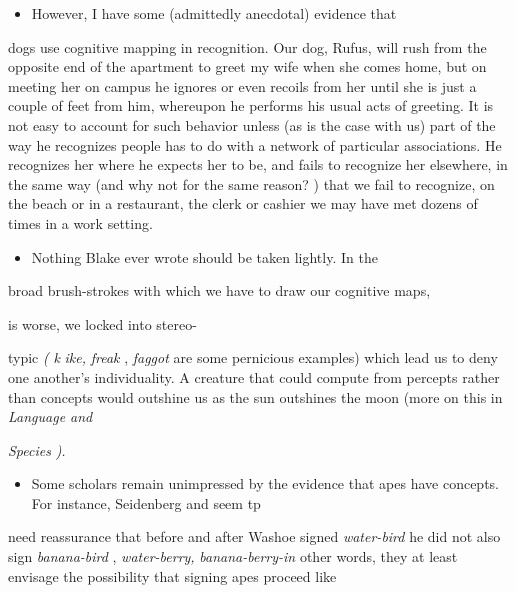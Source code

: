 \begin{itemize}
\begin{itemize}
\begin{itemize}
\begin{itemize}
\begin{itemize}
\begin{itemize}
\begin{itemize}
\begin{itemize}
\begin{itemize}
\begin{itemize}
\begin{itemize}
\begin{itemize}
\begin{itemize}
\item However, I have some (admittedly anecdotal) evidence that
\end{itemize}

dogs use cognitive mapping in recognition. Our dog, Rufus, will rush from the opposite end of the apartment to greet my wife when she comes home, but on meeting her on campus he ignores or even recoils from her until she is just a couple of feet from him, whereupon he performs his usual acts of greeting. It is not easy to account for such behavior unless (as is the case with us) part of the way he recognizes people has to do with a network of particular associations. He recog\-nizes her where he expects her to be, and fails to recognize her else\-where, in the same way (and why not for the same reason? ) that we fail to recognize, on the beach or in a restaurant, the clerk or cashier we may have met dozens of times in a work setting.

\begin{itemize}
\item Nothing Blake ever wrote should be taken lightly. In the
\end{itemize}

broad brush-strokes with which we have to draw our cognitive maps,

is worse, we locked into stereo-

typic \textit{(} \textit{k} \textit{ike,} \textit{freak} , \textit{faggot} are some pernicious examples) which lead us to deny one another's individuality. A creature that could compute from percepts rather than concepts would out\-shine us as the sun outshines the moon (more on this in \textit{Language and}

\textit{S}\textit{pecies} \textit{).}

\begin{itemize}
\item Some scholars remain unimpressed by the evidence that apes have concepts. For instance, Seidenberg and \citet{Petitto1979} seem tp
\end{itemize}

need reassurance that before and after Washoe signed \textit{water-bird} he did not also sign \textit{banana-bird} , \textit{water-berry,} \textit{banana-berry-in} other words, they at least envisage the possibility that signing apes proceed like



\end{itemize}
\end{itemize}
\end{itemize}
\end{itemize}
\end{itemize}
\end{itemize}
\end{itemize}
\end{itemize}
\end{itemize}
\end{itemize}
\end{itemize}
\end{itemize}
